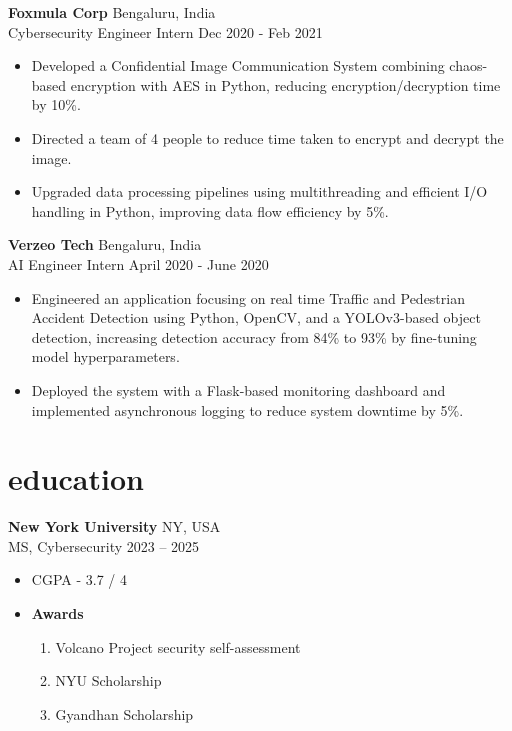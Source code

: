 \documentclass[12pt]{article}
\newcommand{\entry}[4]{{{\textbf{#1}}} \hfill #3 \\ #2 \hfill #4}
\begin{document}
\begin{paracol}{2}
		\entry{Foxmula Corp}{Cybersecurity Engineer Intern}{Bengaluru, India}{Dec 2020 - Feb 2021}
		\begin{itemize}[noitemsep,leftmargin=3.5mm,rightmargin=0mm,topsep=6pt]
			\item Developed a Confidential Image Communication System combining chaos-based encryption with AES in Python, reducing encryption/decryption time by 10\%.
			\item Directed a team of 4 people to reduce time taken to encrypt and decrypt the image.
			\item Upgraded data processing pipelines using multithreading and efficient I/O handling in Python, improving data flow efficiency by 5\%.
		\end{itemize}
		
		\medskip
		\vspace{-20pt}
		
		\entry{Verzeo Tech}{AI Engineer Intern}{Bengaluru, India}{April 2020 - June 2020}
		\begin{itemize}[noitemsep,leftmargin=3.5mm,rightmargin=0mm,topsep=6pt]
			\item Engineered an application focusing on real time Traffic and Pedestrian Accident Detection using Python, OpenCV, and a YOLOv3-based object detection, increasing detection accuracy from 84\% to 93\% by fine-tuning model hyperparameters.
			\item Deployed the system with a Flask-based monitoring dashboard and implemented asynchronous logging to reduce system downtime by 5\%.
		\end{itemize}
		
		
		\switchcolumn
		\vspace{-36pt}
		\section{education}
		
		\entry{New York University}{MS, Cybersecurity}{NY, USA}{2023 -- 2025}
		\begin{itemize}[noitemsep,leftmargin=3.5mm,rightmargin=0mm,topsep=6pt]
			\item CGPA - 3.7 / 4
			\item \textbf{Awards}
			
			\begin{enumerate}
				\item \parbox{6cm} {\raggedright Volcano Project security self-assessment}
				\item NYU Scholarship
				\item Gyandhan Scholarship
			\end{enumerate}
			

\end{itemize}
\end{paracol}
\end{document}
